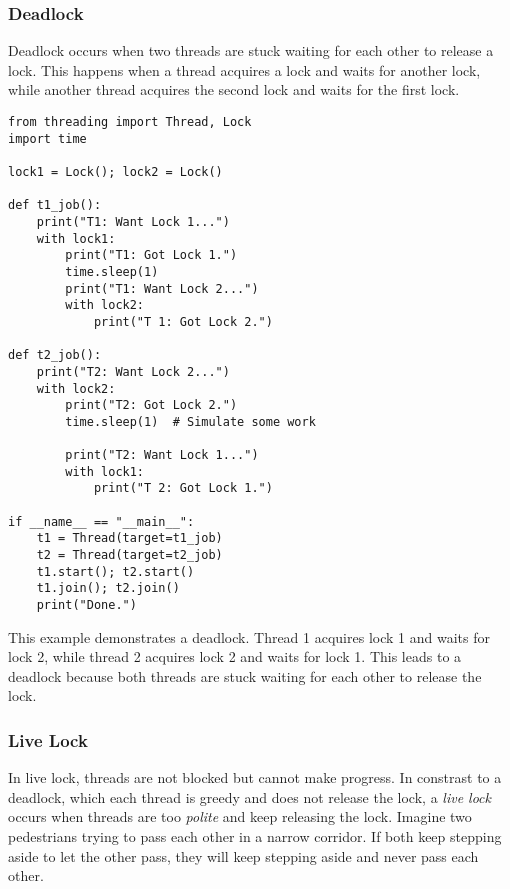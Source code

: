 \documentclass[oneside,11pt,dvipsnames]{book}
\begin{document}
\subsubsection{Deadlock} 

Deadlock occurs when two threads are stuck waiting for each other to release a lock. This happens when a thread acquires a lock and waits for another lock, while another thread acquires the second lock and waits for the first lock. 

\begin{lstlisting}[multicols=2]
from threading import Thread, Lock
import time

lock1 = Lock(); lock2 = Lock()

def t1_job():
    print("T1: Want Lock 1...")
    with lock1:
        print("T1: Got Lock 1.")
        time.sleep(1) 
        print("T1: Want Lock 2...")
        with lock2:
            print("T 1: Got Lock 2.")

def t2_job():
    print("T2: Want Lock 2...")
    with lock2:
        print("T2: Got Lock 2.")
        time.sleep(1)  # Simulate some work

        print("T2: Want Lock 1...")
        with lock1:
            print("T 2: Got Lock 1.")

if __name__ == "__main__":
    t1 = Thread(target=t1_job)
    t2 = Thread(target=t2_job)
    t1.start(); t2.start()
    t1.join(); t2.join()
    print("Done.")
\end{lstlisting}

This example demonstrates a deadlock. Thread 1 acquires lock 1 and waits for lock 2, while thread 2 acquires lock 2 and waits for lock 1. This leads to a deadlock because both threads are stuck waiting for each other to release the lock.

\subsubsection{Live Lock}
In live lock,  threads are not blocked but cannot make progress. In constrast to a deadlock, which each thread is greedy and does not release the lock, a \emph{live lock} occurs when threads are too \emph{polite} and keep releasing the lock. Imagine two pedestrians trying to pass each other in a narrow corridor. If both keep stepping aside to let the other pass, they will keep stepping aside and never pass each other.
\end{document}
